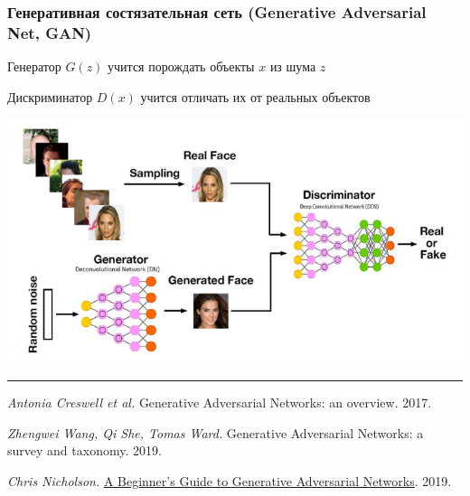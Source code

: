 \documentclass[fullscreen=true, bookmarks=true, hyperref={pdfencoding=unicode}]{beamer}
\begin{document}
\begin{frame}
  \frametitle{Генеративная состязательная сеть (Generative Adversarial Net, GAN)}

  Генератор $G(z)$ учится порождать объекты $x$ из шума $z$

  Дискриминатор $D(x)$ учится отличать их от реальных объектов

  \begin{center}
    \includegraphics[keepaspectratio,
                     width=.7\paperwidth]{GAN_scheme.png}
  \end{center}

  \noindent\rule{8cm}{0.4pt}

  {\tiny
  {\it Antonia Creswell et al.} Generative Adversarial Networks: an overview. 2017.

  {\it Zhengwei Wang, Qi She, Tomas Ward.} Generative Adversarial Networks: a survey and taxonomy. 2019.

  {\it Chris Nicholson.} \href{https://pathmind.com/wiki/generative-adversarial-network-gan}{A Beginner's Guide to Generative Adversarial Networks}. 2019.
  }
\end{frame}
\end{document}

